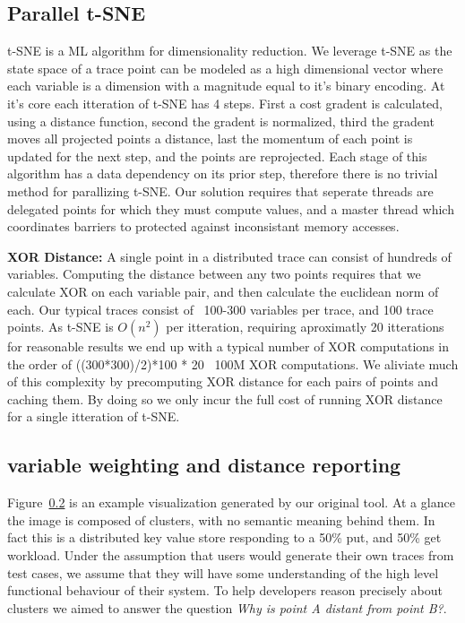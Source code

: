 \subsection{Parallel t-SNE}
\label{sec:ptsne}
t-SNE is a ML algorithm for dimensionality reduction. We leverage t-SNE as the
state space of a trace point can be modeled as a high dimensional vector where
each variable is a dimension with a magnitude equal to it's binary encoding. At
it's core each itteration of t-SNE has 4 steps. First a cost gradent is
calculated, using a distance function, second the gradent is normalized, third
the gradent moves all projected points a distance, last the momentum of each
point is updated for the next step, and the points are reprojected. Each stage
of this algorithm has a data dependency on its prior step, therefore there is
no trivial method for parallizing t-SNE. Our solution requires that seperate
threads are delegated points for which they must compute values, and a master
thread which coordinates barriers to protected against inconsistant memory
accesses.



\noindent\textbf{XOR Distance:} A single point in a distributed trace can
consist of hundreds of variables.  Computing the distance between any
two points requires that we calculate XOR on each variable pair, and
then calculate the euclidean norm of each. Our typical traces consist
of ~100-300 variables per trace, and 100 trace points. As t-SNE is
$O(n^2)$ per itteration, requiring aproximatly 20 itterations for
reasonable results we end up with a typical number of XOR computations
in the order of ((300*300)/2)*100 * 20 ~100M XOR computations. We
aliviate much of this complexity by precomputing XOR distance for each
pairs of points and caching them. By doing so we only incur the full
cost of running XOR distance for a single itteration of t-SNE.


\subsection{variable weighting and distance reporting}

Figure~\ref{} is an example
visualization generated by our original tool. At a glance the image is
composed of  clusters, with no semantic meaning behind them.
In fact this is a distributed key value store responding to a 50\%
put, and 50\% get workload. Under the assumption that users would
generate their own traces from test cases, we assume that they will
have some understanding of the high level functional behaviour of
their system. To help developers reason precisely about clusters we
aimed to answer the question \emph{Why is point A distant from point
B?}. 


